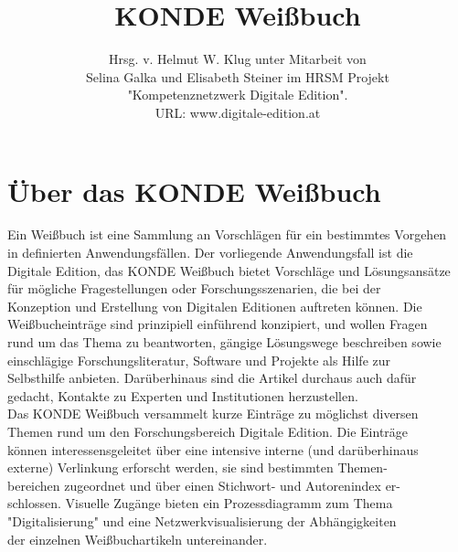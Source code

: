\documentclass{article}
\begin{document}
\begin{titlepage}
\author{Hrsg. v. Helmut W. Klug unter Mitarbeit von \\
Selina Galka und  Elisabeth Steiner im HRSM Projekt \\
"Kompetenznetzwerk Digitale Edition". \\
URL: www.digitale-edition.at} 
\title{KONDE Weißbuch} 
\date{} 
\maketitle
\end{titlepage}
\newpage
\section*{Über das KONDE Weißbuch}
Ein Weißbuch ist eine Sammlung an Vorschlägen für ein bestimmtes Vorgehen \\
in definierten Anwendungsfällen. Der vorliegende Anwendungsfall ist die \\
Digitale Edition, das KONDE Weißbuch bietet Vorschläge und Lösungsansätze \\
für mögliche Fragestellungen oder Forschungsszenarien, die bei der \\
Konzeption und Erstellung von Digitalen Editionen auftreten können. Die \\
Weißbucheinträge sind prinzipiell einführend konzipiert, und wollen Fragen \\
rund um das Thema zu beantworten, gängige Lösungswege beschreiben sowie \\
einschlägige Forschungsliteratur, Software und Projekte als Hilfe zur \\
Selbsthilfe anbieten. Darüberhinaus sind die Artikel durchaus auch dafür \\
gedacht, Kontakte zu Experten und Institutionen herzustellen.\\

Das KONDE Weißbuch versammelt kurze Einträge zu möglichst diversen \\
Themen rund um den Forschungsbereich Digitale Edition. Die Einträge \\
können interessensgeleitet über eine intensive interne (und darüberhinaus \\
externe) Verlinkung erforscht werden, sie sind bestimmten Themen- \\
bereichen zugeordnet und über einen Stichwort- und Autorenindex er-\\
schlossen. Visuelle Zugänge bieten ein Prozessdiagramm zum Thema \\
"Digitalisierung" und eine Netzwerkvisualisierung der Abhängigkeiten\\
der einzelnen Weißbuchartikeln untereinander.\\
\end{document}
